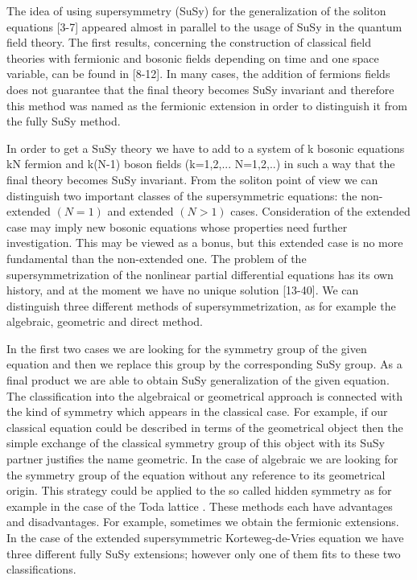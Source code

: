         The idea of using supersymmetry (SuSy) for the
generalization of the soliton equations [3-7] appeared almost in parallel
to the usage of SuSy in the quantum field theory. The first results,
concerning the construction of classical field theories  with fermionic
and bosonic fields
depending on time and one space variable, can be found in [8-12].
In many cases, the  addition of fermions fields does not guarantee that the
final theory becomes SuSy invariant and therefore this method was named as
the fermionic extension in order to distinguish it from the fully SuSy method.

        In order to get a SuSy theory  we have to add to a system of k bosonic
equations kN fermion and k(N-1) boson fields (k=1,2,... N=1,2,..) in such a way
that the final theory becomes SuSy invariant.  From the soliton point of view
we can distinguish two important classes of the supersymmetric equations:
the non-extended $(N = 1)$ and extended $( N > 1 )$ cases. Consideration of the
extended case may imply new bosonic equations whose properties need further
investigation. This may be viewed as a bonus, but this extended case is no
more fundamental than the non-extended one. The problem of the
supersymmetrization of the nonlinear partial differential equations has its
own history, and at the moment we have no unique solution [13-40].
We can distinguish three different methods of
supersymmetrization, as for example the algebraic, geometric and direct method.

        In the first two cases we are looking for the symmetry group of the
given equation and then we replace this group by the corresponding
SuSy group. As a final product we are able to obtain
SuSy generalization
of the given equation. The classification into  the algebraical or
geometrical approach is connected with the kind of symmetry which appears
in the classical case. For example, if our classical equation could be
described  in terms of the geometrical object then the simple exchange
of the classical symmetry group of this object with its SuSy partner
justifies the name geometric. In the case of algebraic we are looking for the
symmetry group of the equation without any reference to its
geometrical origin. This strategy could be applied to the so called
hidden symmetry as for example in the case of the Toda lattice .
These methods each have advantages and disadvantages. For example,
sometimes we obtain the fermionic extensions. In the case of the
extended supersymmetric Korteweg-de-Vries equation  we have three different
fully SuSy extensions; however only one of them fits to these two
classifications.

